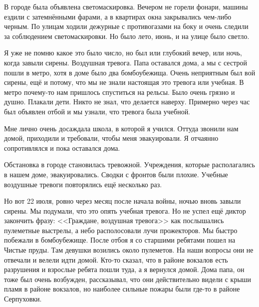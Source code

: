 В городе была объявлена светомаскировка. Вечером не горели фонари, машины ездили с затемнёнными фарами, а в квартирах окна закрывались чем-либо черным.
По улицам ходили дежурные с противогазами на боку и очень следили за соблюдением светомаскировки. Но было лето, июнь, и на улице было светло.

Я уже не помню какое это было число, но был или глубокий вечер, или ночь, когда завыли сирены. Воздушная тревога. Папа оставался дома, а мы с сестрой пошли в метро, хотя в доме было два бомбоубежища. Очень неприятным был вой сирены, ещё и потому, что мы не знали настоящая это тревога или учебная. В метро почему-то нам пришлось спуститься на рельсы. Было очень грязно и душно. Плакали дети. Никто не знал, что делается наверху. Примерно через час был объявлен отбой и мы узнали, что тревога была учебной.

Мне лично очень досаждала школа, в которой я учился. Оттуда звонили нам домой, приходили и требовали, чтобы меня эвакуировали. Я отчаянно сопротивлялся и пока оставался дома.

Обстановка в городе становилась тревожной. Учреждения, которые располагались в нашем доме, эвакуировались. Сводки с фронтов были плохие. Учебные воздушные тревоги повторялись ещё несколько раз.

Но вот 22 июля, ровно через месяц после начала войны, ночью вновь завыли сирены. Мы подумали, что это опять учебная тревога. Но не успел ещё диктор закончить фразу: <<Граждане, воздушная тревога>> как послышались пулеметные выстрелы, а небо располосовали лучи прожекторов. Мы быстро побежали в бомбоубежище. После отбоя я со старшими ребятами пошел на Чистые пруды. Там девушки возились около пулеметов. На наши вопросы они не отвечали и велели идти домой. Кто-то сказал, что в районе вокзалов есть разрушения и взрослые ребята пошли туда, а я вернулся домой. Дома папа, он тоже был очень возбужден, рассказывал, что они действительно видели с крыши пламя в районе вокзалов, но наиболее сильные пожары были где-то в районе Серпуховки.

